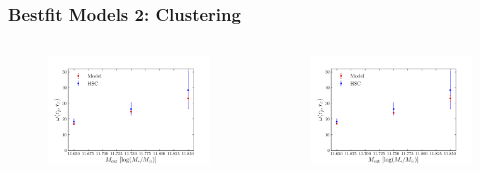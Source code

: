 \documentclass[t]{beamer}
\begin{document}
\begin{frame}
    \frametitle{Bestfit Models 2: Clustering}

    \begin{columns}

    \begin{block}{\vmp{}}
        \begin{figure}
        \includegraphics[width=\textwidth]{images/fit_clust.png}
        \end{figure}
    \end{block}


    \begin{block}{\MhaloPeak{}}
        \begin{figure}
        \includegraphics[width=\textwidth]{images/fit_clust_mpeak.png}
        \end{figure}
    \end{block}
    \end{columns}
\end{frame}
\end{document}
